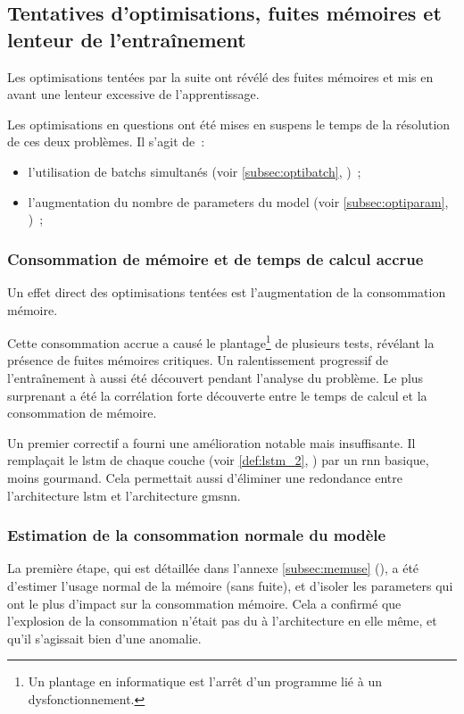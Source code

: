 \subsection{Tentatives d'optimisations, fuites mémoires et lenteur de l'entraînement}\label{subsec:optimem}

Les optimisations tentées par la suite ont révélé des fuites mémoires et mis en avant une lenteur excessive de l'apprentissage.

Les optimisations en questions ont été mises en suspens le temps de la résolution de ces deux problèmes.
Il s'agit de~:
\begin{itemize}
	\item l'utilisation de \glspl{batch} simultanés (voir \autoref{subsec:optibatch}, )~; 
	\item l'augmentation du nombre de \glspl{parameter} du \gls{model} (voir \autoref{subsec:optiparam}, )~;
\end{itemize}

\subsubsection{Consommation de mémoire et de temps de calcul accrue}
Un effet direct des optimisations tentées est l'augmentation de la consommation mémoire.

Cette consommation accrue a causé le plantage\footnote{Un plantage en informatique est l'arrêt d'un programme lié à un dysfonctionnement.} de plusieurs tests, révélant la présence de fuites mémoires critiques.
Un ralentissement progressif de l'entraînement à aussi été découvert pendant l'analyse du problème.
Le plus surprenant a été la corrélation forte découverte entre le temps de calcul et la consommation de mémoire.

Un premier correctif a fourni une amélioration notable mais insuffisante.
Il remplaçait le \gls{lstm} de chaque couche (voir \autoref{def:lstm_2}, ) par un \gls{rnn} basique, moins gourmand. Cela permettait aussi d'éliminer une redondance entre l'architecture \gls{lstm} et l'architecture \gls{gmsnn}.

\subsubsection{Estimation de la consommation normale du modèle}
La première étape, qui est détaillée dans l'annexe \ref{subsec:memuse} (), a été d'estimer l'usage normal de la mémoire (sans fuite), et d'isoler les \glspl{parameter} qui ont le plus d'impact sur la consommation mémoire.
Cela a confirmé que l'explosion de la consommation n'était pas du à l'architecture en elle même, et qu'il s'agissait bien d'une anomalie.

